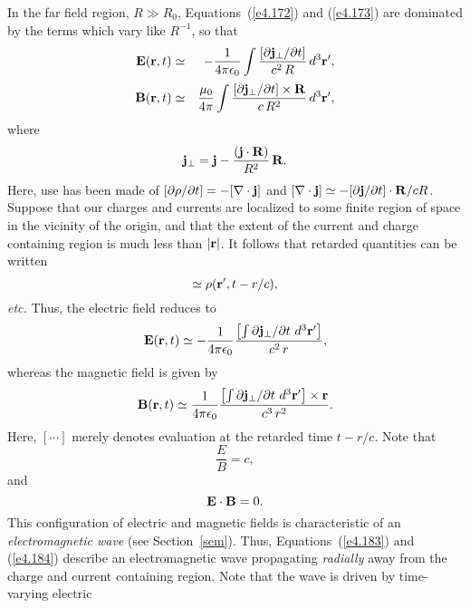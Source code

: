 In the far field region, $R\gg R_0$, Equations~(\ref{e4.172}) and (\ref{e4.173}) are dominated by the terms which
vary like $R^{-1}$, so that
\begin{eqnarray}
{\bf E}({\bf r},t) & \simeq &-\frac{1}{4\pi\epsilon_0}\int\frac{[\partial {\bf j}_\perp /\partial t]}{c^2 \,R}
\,d^3{\bf r}',\\[0.5ex]
{\bf B}({\bf r},t) &\simeq &\frac{\mu_0}{4\pi} \int  \frac{ [\partial {\bf j}_\perp/\partial t]\times {\bf R} }
{c\,R^2}\,d^3{\bf r}',
\end{eqnarray}
where 
\begin{equation}
{\bf j}_\perp = {\bf j} - \frac{({\bf j} \cdot {\bf R})}{R^2}\, {\bf R}.
\end{equation}
Here, use has been made of $[\partial \rho/\partial t] = -[\nabla\cdot {\bf j}]$ and 
$[\nabla\cdot {\bf j} ] \simeq -[\partial {\bf j}/\partial t]\cdot {\bf R}/c R$. 
Suppose that our charges and currents are localized to some finite region of space  in the vicinity of the origin, and that the extent of the current and charge containing region is much less than $|{\bf r}|$. 
It follows that retarded quantities can be written
\begin{equation}
[ \rho({\bf r}', t)] \simeq \rho({\bf r}', t - r/c),
\end{equation}
{\em etc.} Thus, the electric field reduces to
\begin{equation}\label{e4.183}
{\bf E}({\bf r},t) \simeq -\frac{1}{4\pi\epsilon_0} \frac{\left[
\int \partial {\bf j}_\perp/\partial t\,\,d^3{\bf r}'\right]}{c^2\, r},
\end{equation}
whereas the magnetic field is given by
\begin{equation}\label{e4.184}
{\bf B}({\bf r},t) \simeq \frac{1}{4\pi\epsilon_0} \frac{ \left[ \int  \partial {\bf j}_\perp
/\partial t\,\,d^3{\bf r}'\right]
\times{\bf r} }{c^3 \,r^2}.
\end{equation}
Here, $[\cdots]$ merely denotes evaluation at the retarded time $t-r/c$.
Note that 
\begin{equation}
\frac{E}{B} = c,
\end{equation}
and
\begin{equation}
{\bf E} \cdot {\bf B} = 0.
\end{equation}
This configuration of  electric and magnetic fields is characteristic of an {\em electromagnetic wave}\/
(see Section~\ref{sem}).
Thus, Equations~(\ref{e4.183}) and (\ref{e4.184}) describe an electromagnetic wave propagating {\em  radially}
away from the 
charge and current containing region. Note that the wave is driven by time-varying electric

